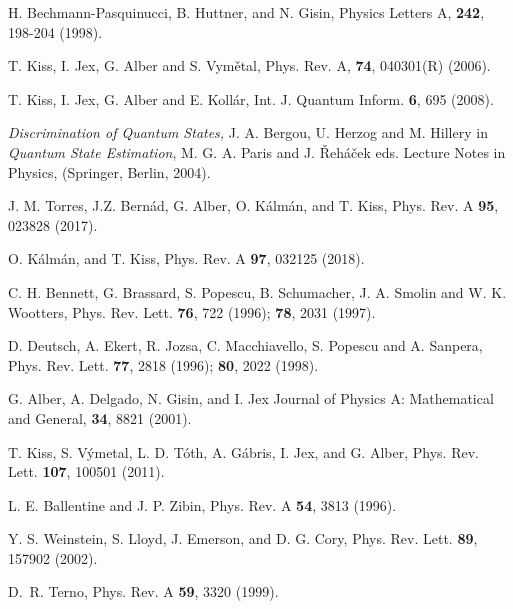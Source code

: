 \documentclass[%
 aip,
 amsmath,amssymb,
 reprint,%
]{revtex4-1}
\begin{document}
\begin{thebibliography}{99}

H. Bechmann-Pasquinucci, B. Huttner, and N. Gisin,
Physics Letters A, {\bf 242}, 198-204 (1998).

  T. Kiss, I. Jex, G. Alber and  S. Vym\v etal,
  Phys. Rev. A, {\bf 74}, 040301(R) (2006).
  
  T. Kiss, I. Jex, G. Alber and  E. Koll\'{a}r,
  Int. J. Quantum Inform. {\bf 6}, 695 (2008).  

 {\it Discrimination of Quantum States,} J. A. Bergou, U. Herzog and M. Hillery in 
{\it Quantum State Estimation}, M. G. A. Paris and J. \v Reh\'a\v cek eds. Lecture Notes in Physics, (Springer, Berlin, 2004).

J. M. Torres, J.Z. Bern\'ad, G. Alber, O. K\'alm\'an, and T. Kiss, Phys. Rev. A {\bf 95}, 023828 (2017). 

O. K\'alm\'an, and T. Kiss, Phys. Rev. A {\bf 97}, 032125 (2018). 

 C. H. Bennett, G. Brassard, S. Popescu, B. Schumacher, J. A. Smolin and W. K. Wootters, Phys. Rev. Lett. {\bf 76}, 722 (1996); {\bf 78}, 2031 (1997).

 D. Deutsch, A. Ekert, R. Jozsa, C. Macchiavello, S. Popescu and A. Sanpera, Phys. Rev. Lett. {\bf 77}, 2818 (1996); {\bf 80}, 2022 (1998).

G. Alber, A. Delgado, N. Gisin, and I. Jex 
Journal of Physics A: Mathematical and General, {\bf 34}, 8821 (2001).

T. Kiss, S. V\'{y}metal, L. D. T\'{o}th, A. G\'{a}bris, I. Jex, and G. Alber, Phys. Rev. Lett. {\bf 107}, 100501 (2011). 

L. E. Ballentine and J. P. Zibin, Phys. Rev. A {\bf 54}, 3813 (1996).

Y. S. Weinstein, S. Lloyd, J. Emerson, and D. G. Cory, Phys. Rev. Lett. {\bf 89}, 157902 (2002).

 D.~R. Terno, Phys. Rev. A {\bf 59}, 3320 (1999).


\end{thebibliography}
\end{document}
